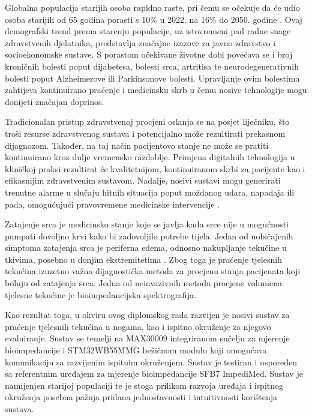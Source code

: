 \documentclass[../diplomski_rad.tex]{subfiles}
\begin{document}
\sloppy

\justifying

Globalna populacija starijih osoba rapidno raste, pri čemu se očekuje da će udio osoba 
starijih od 65 godina porasti s 10\% u 2022. na 16\% do 2050. godine \cite{Chen2023}. 
Ovaj demografski trend prema starenju populacije, uz istovremeni pad radne snage zdravstvenih djelatnika, predstavlja značajne izazove za 
javno zdravstvo i socioekonomske sustave. 
S porastom očekivane životne dobi povećava se i broj kroničnih bolesti poput dijabetesa, 
bolesti srca, artritisa te neurodegenerativnih bolesti poput Alzheimerove ili Parkinsonove bolesti. 
Upravljanje ovim bolestima zahtijeva kontinuirano praćenje i medicinsku skrb u čemu 
nosive tehnologije mogu donijeti značajan doprinos. 

Tradicionalan pristup zdravstvenoj procjeni oslanja se na posjet liječniku, što troši resurse zdravstvenog sustava 
i potencijalno može rezultirati prekasnom dijagnozom. 
Također, na taj način pacijentovo stanje ne može se pratiti kontinuirano kroz dulje vremensko razdoblje.
Primjena digitalnih tehnologija u kliničkoj praksi rezultirat će kvalitetnijom, kontinuiranom skrbi za pacijente kao i 
efikasnijim zdravstvenim sustavom. 
Nadalje, nosivi sustavi mogu generirati trenutne alarme u slučaju hitnih situacija poput moždanog udara, 
napadaja ili pada, omogućujući pravovremene medicinske intervencije \cite{Chen2023}.

Zatajenje srca je medicinsko stanje koje se javlja kada srce nije u mogućnosti pumpati dovoljno krvi kako bi 
zadovoljilo potrebe tijela. Jedan od uobičajenih simptoma zatajenja srca je periferna edema, odnosno nakupljanje 
tekućine u tkivima, posebno u donjim ekstremitetima \cite{Abassi2022}. Zbog toga je praćenje tjelesnih tekućina izuzetno važna 
dijagnostička metoda za procjenu stanja pacijenata koji boluju od zatajenja srca. Jedna od neinvazivnih metoda 
procjene volumena tjelesne tekućine je bioimpedancijska spektrografija. 

Kao rezultat toga, u okviru ovog diplomskog rada razvijen je nosivi sustav za praćenje tjelesnih tekućina u nogama, 
kao i ispitno okruženje za njegovo evaluiranje. 
Sustav se temelji na MAX30009 integriranom sučelju za mjerenje bioimpedancije i STM32WB55MMG bežičnom modulu koji omogućava komunikaciju 
sa razvijenim ispitnim okruženjem. Sustav je testiran i uspoređen sa referentnim uređajem za mjerenje bioimpedancije SFB7 ImpediMed.
Sustav je namijenjen starijoj populaciji te je stoga prilikom razvoja uređaja i ispitnog okruženja 
posebna pažnja pridana jednostavnosti i intuitivnosti korištenja sustava. 
\end{document}

